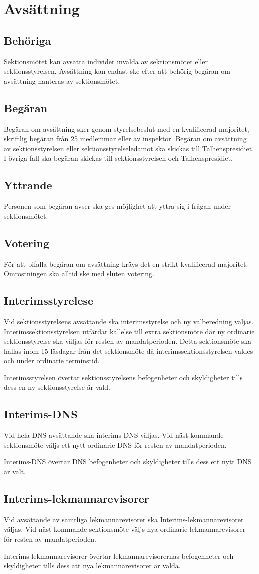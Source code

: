 \section{Avsättning}
\subsection{Behöriga}
Sektionsmötet kan avsätta individer invalda av sektionsmötet eller sektionsstyrelsen.
Avsättning kan endast ske efter att behörig begäran om avsättning hanteras av sektionsmötet.
\subsection{Begäran}
Begäran om avsättning sker genom styrelsebeslut med en kvalificerad majoritet, skriftlig begäran från 25 medlemmar eller av inspektor.
Begäran om avsättning av sektionsstyrelsen eller sektionsstyrelseledamot ska skickas till Talhenspresidiet.
I övriga fall ska begäran skickas till sektionsstyrelsen och Talhenspresidiet.
\subsection{Yttrande}
Personen som begäran avser ska ges möjlighet att yttra sig i frågan under sektionsmötet.
\subsection{Votering}
För att bifalla begäran om avsättning krävs det en strikt kvalificerad majoritet.
Omröstningen ska alltid ske med sluten votering.
\subsection{Interimsstyrelese}
Vid sektionsstyrelsens avsättande ska interimsstyrelse och ny valberedning väljas.
Interimssektionsstyrelsen utfärdar kallelse till extra sektionsmöte där ny ordinarie sektionsstyrelse ska väljas för resten av mandatperioden.
Detta sektionsmöte ska hållas inom 15 läsdagar från det sektionsmöte då interimssektionsstyrelsen valdes och under ordinarie terminstid.

Interimsstyrelsen övertar sektionsstyrelsens befogenheter och skyldigheter tills dess en ny sektionsstyrelse är vald.
\subsection{Interims-DNS}
Vid hela DNS avsättande ska interims-DNS väljas.
Vid näst kommande sektionsmöte väljs ett nytt ordinarie DNS för resten av mandatperioden.

Interims-DNS övertar DNS befogenheter och skyldigheter tills dess ett nytt DNS är valt.
\subsection{Interims-lekmannarevisorer}
Vid avsättande av samtliga lekmannarevisorer ska Interims-lekmannarevisorer väljas.
Vid näst kommande sektionsmöte väljs nya ordinarie lekmannarevisorer för resten av mandatperioden.

Interims-lekmannarevisorer övertar lekmannarevisorernas befogenheter och skyldigheter tills dess att nya lekmannarevisorer är valda.

